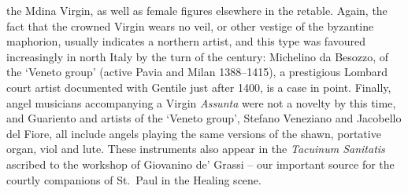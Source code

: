 \documentclass[a4paper,12pt]{article}
\begin{document}
the Mdina Virgin, as well as female figures elsewhere in the
retable. Again, the fact that the crowned Virgin wears no veil, or
other vestige of the byzantine maphorion, usually indicates a northern
artist, and this type was favoured increasingly in north Italy by the
turn of the century: Michelino da Besozzo, of the `Veneto group'
(active Pavia and Milan 1388--1415), a prestigious Lombard court
artist documented with Gentile just after 1400, is a case in
point. Finally, angel musicians accompanying a Virgin \textit{Assunta}
were not a novelty by this time, and Guariento and artists of the
`Veneto group', Stefano Veneziano and Jacobello del Fiore, all include
angels playing the same versions of the shawn, portative organ, viol
and lute. These instruments also appear in the \textit{Tacuinum
Sanitatis} ascribed to the workshop of Giovanino de' Grassi -- our
important source for the courtly companions of St.~Paul in the Healing
scene.
\end{document}

